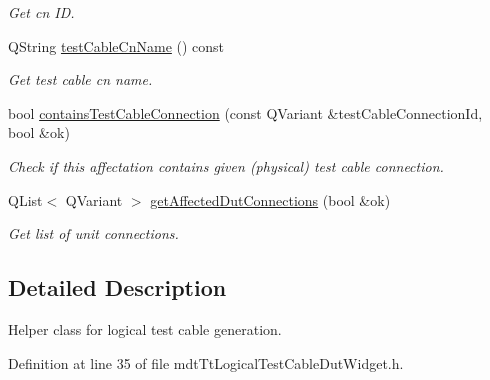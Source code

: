 \begin{DoxyCompactItemize}
\begin{DoxyCompactList}\small\item\em Get cn I\-D. \end{DoxyCompactList}\item 
Q\-String \hyperlink{classmdt_tt_logical_test_cable_dut_widget_ab50cf8a8d12a1f5c6c64718e0f0dfa01}{test\-Cable\-Cn\-Name} () const 
\begin{DoxyCompactList}\small\item\em Get test cable cn name. \end{DoxyCompactList}\item 
bool \hyperlink{classmdt_tt_logical_test_cable_dut_widget_afde1ec1db88b7bc0633738beeec28b37}{contains\-Test\-Cable\-Connection} (const Q\-Variant \&test\-Cable\-Connection\-Id, bool \&ok)
\begin{DoxyCompactList}\small\item\em Check if this affectation contains given (physical) test cable connection. \end{DoxyCompactList}\item 
Q\-List$<$ Q\-Variant $>$ \hyperlink{classmdt_tt_logical_test_cable_dut_widget_a5cf86651cfee32f230c160d4b524ff9a}{get\-Affected\-Dut\-Connections} (bool \&ok)
\begin{DoxyCompactList}\small\item\em Get list of unit connections. \end{DoxyCompactList}\end{DoxyCompactItemize}


\subsection{Detailed Description}
Helper class for logical test cable generation. 

Definition at line 35 of file mdt\-Tt\-Logical\-Test\-Cable\-Dut\-Widget.\-h.



